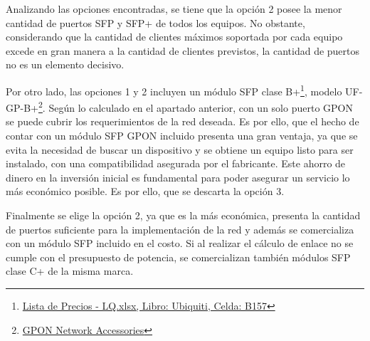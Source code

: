 \documentclass[11pt,a4paper]{article}
\begin{document}
Analizando las opciones encontradas, se tiene que la opción 2 posee la menor cantidad de puertos SFP y SFP+ de todos los equipos. 
No obstante, considerando que la cantidad de clientes máximos soportada por cada equipo excede en gran manera a la cantidad de clientes previstos, la cantidad de puertos no es un elemento decisivo. 

Por otro lado, las opciones 1 y 2 incluyen un módulo SFP clase B+\footnote{\href{https://docs.google.com/spreadsheets/d/1rmlMl8y5O11057Wbb303iKk9dc6XedijkpFMKAgwH_U/edit\#gid=2076166277}{Lista de Precios - LQ.xlsx, Libro: Ubiquiti, Celda: B157}}, modelo UF-GP-B+\footnote{\href{https://www.ui.com/accessories/gpon-network-accessories/}{GPON Network Accessories}}.
Según lo calculado en el apartado anterior, con un solo puerto GPON se puede cubrir los requerimientos de la red deseada. 
Es por ello, que el hecho de contar con un módulo SFP GPON incluido presenta una gran ventaja, ya que se evita la necesidad de buscar un dispositivo y se obtiene un equipo listo para ser instalado, con una compatibilidad asegurada por el fabricante. 
Este ahorro de dinero en la inversión inicial es fundamental para poder asegurar un servicio lo más económico posible. 
Es por ello, que se descarta la opción 3. 

Finalmente se elige la opción 2, ya que es la más económica, presenta la cantidad de puertos suficiente para la implementación de la red y además se comercializa con un módulo SFP incluido en el costo. 
Si al realizar el cálculo de enlace no se cumple con el presupuesto de potencia, se comercializan también módulos SFP clase C+ de la misma marca. 
\end{document}
